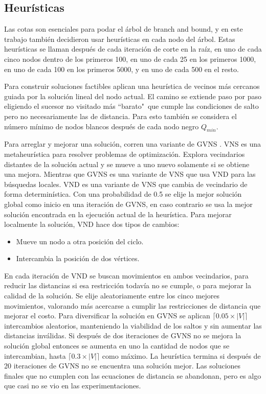 \documentclass[10pt, a4paper]{article}
\theoremstyle{definition}
\begin{document}
\subsection{Heurísticas}

Las cotas son esenciales para podar el árbol de branch and bound, y en este trabajo también decidieron usar heurísticas en cada nodo del árbol. Estas heurísticas se llaman después de cada iteración de corte en la raíz, en uno de cada cinco nodos dentro de los primeros 100, en uno de cada 25 en los primeros 1000, en uno de cada 100 en los primeros 5000, y en uno de cada 500 en el resto.

Para construir soluciones factibles aplican una heurística de vecinos más cercanos guiada por la solución lineal del nodo actual. El camino se extiende paso por paso eligiendo el sucesor no visitado más “barato"\ que cumple las condiciones de salto pero no necesariamente las de distancia. Para esto también se considera el número mínimo de nodos blancos después de cada nodo negro $Q_{min}$.

Para arreglar y mejorar una solución, corren una variante de GVNS \cite{gvns}. VNS es una metaheurística para resolver problemas de optimización. Explora vecindarios distantes de la solución actual y se mueve a uno nuevo solamente si se obtiene una mejora. Mientras que GVNS es una variante de VNS que usa VND para las búsquedas locales. VND es una variante de VNS que cambia de vecindario de forma determinística. Con una probabilidad de 0.5 se elije la mejor solución global como inicio en una iteración de GVNS, en caso contrario se usa la mejor solución encontrada en la ejecución actual de la heurística. Para mejorar localmente la solución, VND hace dos tipos de cambios:

\begin{itemize}
	\item Mueve un nodo a otra posición del ciclo.
	\item Intercambia la posición de dos vértices.
\end{itemize}

En cada iteración de VND se buscan movimientos en ambos vecindarios, para reducir las distancias si esa restricción todavía no se cumple, o para mejorar la calidad de la solución. Se elije aleatoriamente entre los cinco mejores movimientos, valorando más acercarse a cumplir las restricciones de distancia que mejorar el costo. Para diversificar la solución en GVNS se aplican $\lceil 0.05 \times |V| \rceil$ intercambios aleatorios, manteniendo la viabilidad de los saltos y sin aumentar las distancias inválidas. Si después de dos iteraciones de GVNS no se mejora la solución global entonces se aumenta en uno la cantidad de nodos que se intercambian, hasta  $\lceil 0.3 \times |V| \rceil$ como máximo. La heurística termina si después de 20 iteraciones de GVNS no se encuentra una solución mejor. Las soluciones finales que no cumplen con las ecuaciones de distancia se abandonan, pero es algo que casi no se vio en las experimentaciones.
\end{document}
